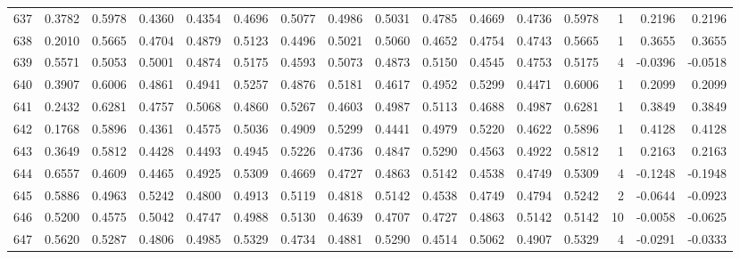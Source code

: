 \begin{tabular}{lrrrrrrrrrrrrrrr}
637 &      0.3782 &  0.5978 &  0.4360 &  0.4354 &  0.4696 &  0.5077 &  0.4986 &  0.5031 &  0.4785 &  0.4669 &   0.4736 &     0.5978 &      1 &                    0.2196 &                     0.2196 \\
638 &      0.2010 &  0.5665 &  0.4704 &  0.4879 &  0.5123 &  0.4496 &  0.5021 &  0.5060 &  0.4652 &  0.4754 &   0.4743 &     0.5665 &      1 &                    0.3655 &                     0.3655 \\
639 &      0.5571 &  0.5053 &  0.5001 &  0.4874 &  0.5175 &  0.4593 &  0.5073 &  0.4873 &  0.5150 &  0.4545 &   0.4753 &     0.5175 &      4 &                   -0.0396 &                    -0.0518 \\
640 &      0.3907 &  0.6006 &  0.4861 &  0.4941 &  0.5257 &  0.4876 &  0.5181 &  0.4617 &  0.4952 &  0.5299 &   0.4471 &     0.6006 &      1 &                    0.2099 &                     0.2099 \\
641 &      0.2432 &  0.6281 &  0.4757 &  0.5068 &  0.4860 &  0.5267 &  0.4603 &  0.4987 &  0.5113 &  0.4688 &   0.4987 &     0.6281 &      1 &                    0.3849 &                     0.3849 \\
642 &      0.1768 &  0.5896 &  0.4361 &  0.4575 &  0.5036 &  0.4909 &  0.5299 &  0.4441 &  0.4979 &  0.5220 &   0.4622 &     0.5896 &      1 &                    0.4128 &                     0.4128 \\
643 &      0.3649 &  0.5812 &  0.4428 &  0.4493 &  0.4945 &  0.5226 &  0.4736 &  0.4847 &  0.5290 &  0.4563 &   0.4922 &     0.5812 &      1 &                    0.2163 &                     0.2163 \\
644 &      0.6557 &  0.4609 &  0.4465 &  0.4925 &  0.5309 &  0.4669 &  0.4727 &  0.4863 &  0.5142 &  0.4538 &   0.4749 &     0.5309 &      4 &                   -0.1248 &                    -0.1948 \\
645 &      0.5886 &  0.4963 &  0.5242 &  0.4800 &  0.4913 &  0.5119 &  0.4818 &  0.5142 &  0.4538 &  0.4749 &   0.4794 &     0.5242 &      2 &                   -0.0644 &                    -0.0923 \\
646 &      0.5200 &  0.4575 &  0.5042 &  0.4747 &  0.4988 &  0.5130 &  0.4639 &  0.4707 &  0.4727 &  0.4863 &   0.5142 &     0.5142 &     10 &                   -0.0058 &                    -0.0625 \\
647 &      0.5620 &  0.5287 &  0.4806 &  0.4985 &  0.5329 &  0.4734 &  0.4881 &  0.5290 &  0.4514 &  0.5062 &   0.4907 &     0.5329 &      4 &                   -0.0291 &                    -0.0333 \\

\end{tabular}
